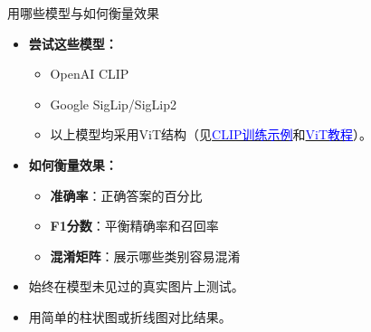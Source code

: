 \begin{refsection}
\begin{frame}{用哪些模型与如何衡量效果}
  \begin{itemize}
    \item \textbf{尝试这些模型：}
      \begin{itemize}
        \item OpenAI CLIP~\parencite{radfordLearningTransferableVisual2021}
        \item Google SigLip/SigLip2~\parencite{tschannenSigLIP2Multilingual2025,Zhai_2023_ICCV}
        \item 以上模型均采用ViT结构（见\href{https://github.com/huggingface/transformers/blob/main/examples/pytorch/contrastive-image-text/README.md}{\textcolor{blue}{CLIP训练示例}}和\href{https://github.com/NielsRogge/Transformers-Tutorials/tree/master/VisionTransformer}{\textcolor{blue}{ViT教程}}）。
      \end{itemize}
    \item \textbf{如何衡量效果：}
      \begin{itemize}
        \item \textbf{准确率}：正确答案的百分比
        \item \textbf{F1分数}：平衡精确率和召回率
        \item \textbf{混淆矩阵}：展示哪些类别容易混淆
      \end{itemize}
    \item 始终在模型未见过的真实图片上测试。
    \item 用简单的柱状图或折线图对比结果。
  \end{itemize}
  \bottomleftrefs
\end{frame}
\end{refsection}